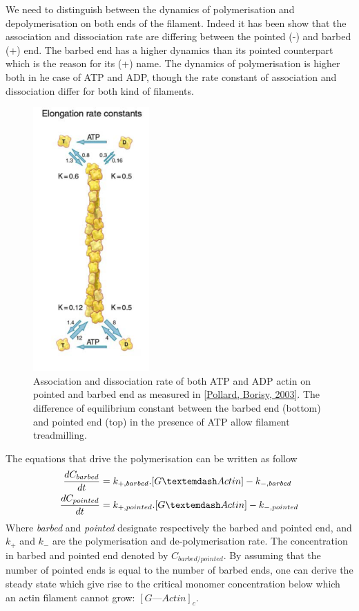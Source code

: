 \documentclass[A4paperpaper,11pt,english]{sphinxmanual}
\begin{document}
We need to distinguish between the dynamics of polymerisation and
depolymerisation on both ends of the filament. Indeed it has been show that the
association and dissociation rate are differing between the pointed (-) and
barbed (+) end. The barbed end has a  higher dynamics than its pointed
counterpart which is the reason for its (+) name. The dynamics of
polymerisation  is higher both in he case of ATP and ADP, though the rate
constant of association and dissociation differ for both kind of filaments.
\begin{figure}[htbp]
\centering
\capstart

\includegraphics[width=0.250\linewidth]{elongation-rate-constant.png}
\caption{Association and dissociation rate of both ATP and ADP actin on pointed and
barbed end as measured in {\hyperref[parts/part1:pollard2003]{{[}Pollard, Borisy,  2003{]}}}. The difference of
equilibrium constant between the barbed end (bottom) and pointed end (top) in the presence of ATP
allow filament treadmilling.}\label{parts/part1:id13}\end{figure}

The equations that drive the polymerisation can be written as follow
\begin{gather}
\begin{split}\frac{dC_{barbed}}{dt} &= k_{+,{barbed}}.[G—Actin] - k_{-,{barbed}} \\
\frac{dC_{pointed}}{dt} &= k_{+,{pointed}}.[G—Actin] - k_{-,{pointed}} \\\end{split}\notag
\end{gather}
Where \emph{barbed} and \emph{pointed} designate respectively the barbed and pointed end,
and \(k_+\) and \(k_-\) are the polymerisation and de-polymerisation
rate.  The concentration in barbed and pointed end denoted by
\(C_{{barbed}/{pointed}}\). By assuming that the number of pointed ends is
equal to the number of barbed ends, one can derive the steady state which give
rise to the critical monomer concentration below which an actin filament cannot
grow: \([G—Actin]_c\).
\end{document}
